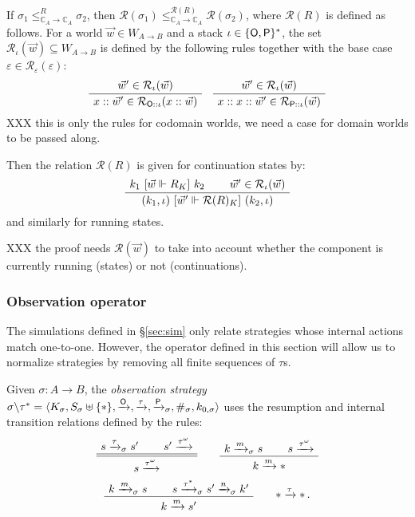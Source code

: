 {\begin{lemma}
If
$\sigma_1 \le_{\mathbb{C}_A \rightarrow \mathbb{C}_A}^R \sigma_2$,
then
$\mathcal{R}(\sigma_1)
 \le_{\mathbb{C}_A \rightarrow \mathbb{C}_A}^{\mathcal{R}(R)}
 \mathcal{R}(\sigma_2)$,
where $\mathcal{R}(R)$ is defined as follows.
For a world $\vec{w} \in W_{A \rightarrow B}$
and a stack $\iota \in \{ \mathsf{O} ,  \mathsf{P} \}^*$,
the set $\mathcal{R}_\iota(\vec{w}) \subseteq W_{A \rightarrow B}$
is defined by the following rules together with the base case
$\varepsilon \in \mathcal{R}_\varepsilon(\varepsilon)$:
\[
    \AxiomC{$\vec{w}' \in \mathcal{R}_\iota(\vec{w})$}
    \UnaryInfC{$x :: \vec{w}' \in \mathcal{R}_{\kw{O} :: \iota}(x :: \vec{w})$}
    \DisplayProof
    \quad
    \AxiomC{$\vec{w}' \in \mathcal{R}_\iota(\vec{w})$}
    \UnaryInfC{$x :: x :: \vec{w}' \in \mathcal{R}_{\kw{P} :: \iota}(\vec{w})$}
    \DisplayProof
\]
XXX this is only the rules for codomain worlds,
we need a case for domain worlds to be passed along.

Then the relation $\mathcal{R}(R)$ is given for continuation states by:
\[
  \AxiomC{$k_1 \ifr{\vec{w} \Vdash R_K} k_2$}
  \AxiomC{$\vec{w}' \in \mathcal{R}_\iota(\vec{w})$}
  \BinaryInfC{$(k_1, \iota) \ifr{\vec{w}' \Vdash \mathcal{R}(R)_K} (k_2, \iota)$}
  \DisplayProof
\]
and similarly for running states.

XXX the proof needs $\mathcal{R}(\vec{w})$ to take into account
whether the component is currently running (states) or not (continuations).
\end{lemma}


\subsubsection{Observation operator} %

The simulations defined in \S\ref{sec:sim}
only relate strategies whose internal actions match one-to-one.
However, the operator defined in this section
will allow us to normalize strategies by removing
all finite sequences of $\tau$s.

\begin{definition}
Given $\sigma : A \rightarrow B$,
the \emph{observation strategy}
$\sigma \backslash \tau^* =
 \langle K_\sigma, S_\sigma \uplus \{\ast\},
         \xrightarrow{ \mathsf{O} },
         \xrightarrow{\tau},
         \xrightarrow{ \mathsf{P} }_\sigma,
         \#_\sigma, k_{0,\sigma} \rangle$
uses the resumption and internal transition relations
defined by the rules:
\[
  \AxiomC{$s \xrightarrow{\tau}_\sigma s'$}
  \AxiomC{$s' \xrightarrow{\tau^\omega}$}
  \doubleLine \BinaryInfC{$s \xrightarrow{\tau^\omega}$}
  \DisplayProof
  \qquad
  \AxiomC{$k \xrightarrow{m}_\sigma s$}
  \AxiomC{$s \xrightarrow{\tau^\omega}$}
  \BinaryInfC{$k \xrightarrow{m} \ast$}
  \DisplayProof
\]\[
  \AxiomC{$k \xrightarrow{m}_\sigma s$}
  \AxiomC{$s \xrightarrow{\tau^*}_\sigma s' \xrightarrow{n}_\sigma k'$}
  \BinaryInfC{$k \xrightarrow{m} s'$}
  \DisplayProof
  \qquad
  \ast \xrightarrow{\tau} \ast \,.
\]
\end{definition}

}
